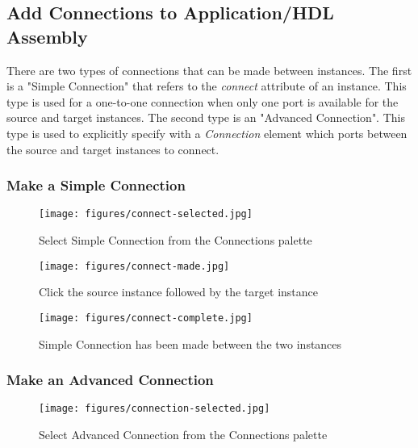 \subsection{Add Connections to Application/HDL Assembly}
\label{sec:add_application_connections}
\begin{flushleft}

There are two types of connections that can be made between instances. The first is a "Simple Connection" that refers to the \textit{connect} attribute of an instance. This type is used for a one-to-one connection when only one port is available for the source and target instances. The second type is an "Advanced Connection". This type is used to explicitly specify with a \textit{Connection} element which ports between the source and target instances to connect.

\subsubsection{Make a Simple Connection}
\label{sec:add_simple_connection}

\begin{figure}[h!]
    \centering
	\texttt{[image: figures/connect-selected.jpg]}
	\caption{Select Simple Connection from the Connections palette}
	\label{fig:figure19}
\end{figure}

\begin{figure}[h!]
    \centering
	\texttt{[image: figures/connect-made.jpg]}
	\caption{Click the source instance followed by the target instance}
	\label{fig:figure20}
\end{figure}

\begin{figure}[h!]
    \centering
	\texttt{[image: figures/connect-complete.jpg]}
	\caption{Simple Connection has been made between the two instances}
	\label{fig:figure21}
\end{figure}
\newpage

\subsubsection{Make an Advanced Connection}
\label{sec:add_advanced_connection}

\begin{figure}[h!]
    \centering
	\texttt{[image: figures/connection-selected.jpg]}
	\caption{Select Advanced Connection from the Connections palette}
	\label{fig:figure22}
\end{figure}


\end{flushleft}
